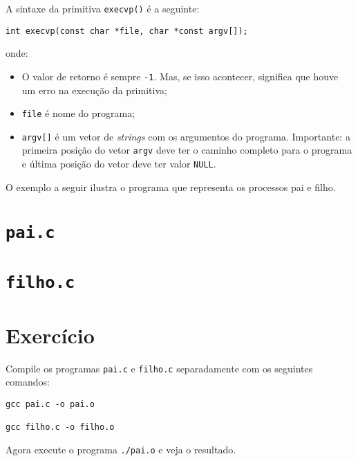 A sintaxe da primitiva \texttt{execvp()} é a seguinte:

\begin{lstlisting}[style=MyCStyle, frame=none]
int execvp(const char *file, char *const argv[]);
\end{lstlisting}
 
onde: 
\begin{itemize}
    \item O valor de retorno é sempre \texttt{-1}. Mas, se isso acontecer, significa que houve um erro na execução da primitiva;
    \item \texttt{file} é nome do programa;
    \item \texttt{argv[]} é um vetor de \textit{strings} com os argumentos do programa. Importante: a primeira posição do vetor \texttt{argv} deve ter o caminho completo para o programa e última posição do vetor deve ter valor \texttt{NULL}.
 \end{itemize}
 
 O exemplo a seguir ilustra o programa que representa os processos pai e filho. 
 
 \section*{\texttt{pai.c}}
 
 
 \section*{\texttt{filho.c}}
 
 
 \section{Exercício}
 Compile os programas \texttt{pai.c} e \texttt{filho.c} separadamente com os seguintes comandos:

\begin{lstlisting}[style=MyBashStyle]
gcc pai.c -o pai.o

gcc filho.c -o filho.o
\end{lstlisting}


Agora execute o programa \texttt{./pai.o} e veja o resultado.